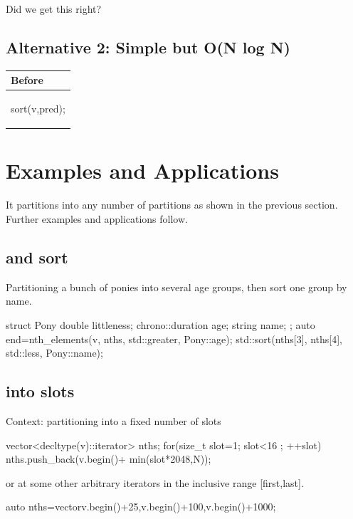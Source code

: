 Did we get this right?

\subsection*{Alternative 2: Simple but O(N log N)}

\begin{tabular}{|l|} 
  \hline 
  \textbf{Before} \\
  \hline 
\begin{codeblock} 
sort(v,pred);
\end{codeblock}
\\
\hline 
\end{tabular} 

\section{Examples and Applications}

It partitions into any number of partitions as shown in the previous section. Further examples and applications follow.

\subsection{ and sort}

Partitioning a bunch of ponies into several age groups, then sort one group by name.

\begin{codeblock}
struct Pony{
  double littleness; 
  chrono::duration age;
  string name;
};
auto end=nth_elements(v, nths, std::greater{}, Pony::age);
std::sort(nths[3], nths[4], std::less{}, Pony::name);
\end{codeblock}

\subsection{ into slots}
Context: partitioning into a fixed number of slots
\begin{codeblock}
vector<decltype(v)::iterator> nths;
for(size_t slot=1; slot<16 ; ++slot){
	nths.push_back(v.begin()+ min(slot*2048,N));
}
\end{codeblock}
or at some other arbitrary iterators in the inclusive range [first,last].
\begin{codeblock}
auto nths=vector{v.begin()+25,v.begin()+100,v.begin()+1000}; 
\end{codeblock}

